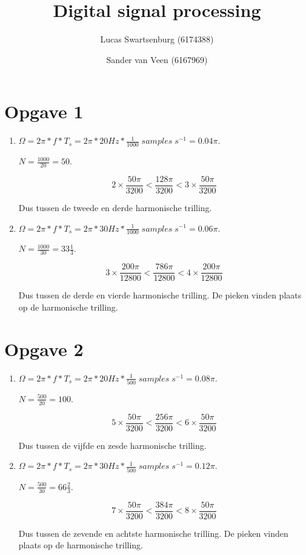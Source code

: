\documentclass[10pt,a4paper]{article}
\title{Digital signal processing}
\author{Lucas Swartsenburg (6174388) \and Sander van Veen (6167969)}
\begin{document}
\maketitle
\tableofcontents

\pagebreak

\section*{Opgave 1} %
\label{sec:Opgave 1}

\begin{enumerate}
    \item $ \Omega = 2\pi * f * T_s = 2\pi * 20 Hz * \frac{1}{1000} \; samples
        \; s^{-1} = 0.04 \pi  $.

    \noindent $ N = \frac{1000}{20} = 50 $.

    \[ 2 \times \frac{50 \pi}{3200} < \frac{128 \pi}{3200} < 3 \times
    \frac{50 \pi}{3200} \]

    \noindent Dus tussen de tweede en derde harmonische trilling.

    \item $ \Omega = 2\pi * f * T_s = 2\pi * 30 Hz * \frac{1}{1000} \; samples
        \; s^{-1} = 0.06 \pi  $.

    \noindent $ N = \frac{1000}{30} = 33 \frac{1}{3} $.

    \[ 3 \times \frac{200 \pi}{12800} < \frac{786 \pi}{12800} < 4 \times
    \frac{200 \pi}{12800} \]

    \noindent Dus tussen de derde en vierde harmonische trilling.
    De pieken vinden plaats op de harmonische trilling.
\end{enumerate}


\section*{Opgave 2} %
\label{sec:Opgave 2}

\begin{enumerate}
    \item $ \Omega = 2\pi * f * T_s = 2\pi * 20 Hz * \frac{1}{500} \; samples
        \; s^{-1} = 0.08 \pi $.

    \noindent $ N = \frac{500}{20} = 100 $.

    \[ 5 \times \frac{50 \pi}{3200} < \frac{256 \pi}{3200} < 6 \times
    \frac{50 \pi}{3200} \]

    \noindent Dus tussen de vijfde en zesde harmonische trilling.

    \item $ \Omega = 2\pi * f * T_s = 2\pi * 30 Hz * \frac{1}{500} \; samples
        \; s^{-1} = 0.12 \pi  $.

    \noindent $ N = \frac{500}{30} = 66 \frac{2}{3} $.

    \[ 7 \times \frac{50 \pi}{3200} < \frac{384 \pi}{3200} < 8 \times
    \frac{50 \pi}{3200} \]

    \noindent Dus tussen de zevende en achtste harmonische trilling.
    De pieken vinden plaats op de harmonische trilling.
\end{enumerate}
\end{document}
